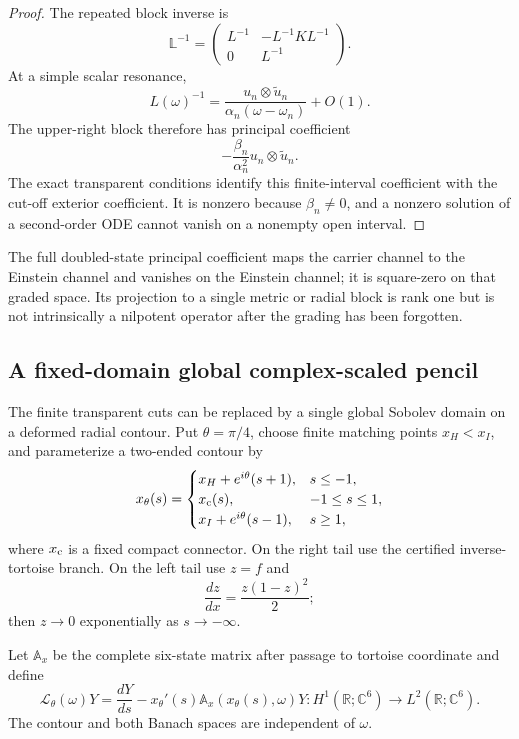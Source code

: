 \documentclass[11pt]{article}
\theoremstyle{remark}
\begin{document}
\begin{proof}
The repeated block inverse is
\[
 \mathbb L^{-1}=
 \begin{pmatrix}
 L^{-1}&-L^{-1}KL^{-1}\\
 0&L^{-1}
 \end{pmatrix}.
\]
At a simple scalar resonance,
\[
 L(\omega)^{-1}
 =\frac{u_n\otimes\widetilde u_n}
 {\alpha_n(\omega-\omega_n)}+O(1).
\]
The upper-right block therefore has principal coefficient
\[
 -\frac{\beta_n}{\alpha_n^2}
 u_n\otimes\widetilde u_n.
\]
The exact transparent conditions identify this finite-interval
coefficient with the cut-off exterior coefficient.  It is nonzero because
\(\beta_n\ne0\), and a nonzero solution of a second-order ODE cannot
vanish on a nonempty open interval.
\end{proof}

The full doubled-state principal coefficient maps the carrier channel to
the Einstein channel and vanishes on the Einstein channel; it is
square-zero on that graded space.  Its projection to a single metric or
radial block is rank one but is not intrinsically a nilpotent operator
after the grading has been forgotten.

\subsection{A fixed-domain global complex-scaled pencil}

The finite transparent cuts can be replaced by a single global Sobolev
domain on a deformed radial contour.  Put \(\theta=\pi/4\), choose finite
matching points \(x_H<x_I\), and parameterize a two-ended contour by
\[
 x_\theta(s)=
 \begin{cases}
 x_H+e^{i\theta}(s+1),&s\le-1,\\
 x_{\rm c}(s),&-1\le s\le1,\\
 x_I+e^{i\theta}(s-1),&s\ge1,
 \end{cases}
\]
where \(x_{\rm c}\) is a fixed compact connector.  On the right tail use
the certified inverse-tortoise branch.  On the left tail use
\(z=f\) and
\[
 \frac{dz}{dx}=\frac{z(1-z)^2}{2};
\]
then \(z\to0\) exponentially as \(s\to-\infty\).

Let \(\mathbb A_x\) be the complete six-state matrix after passage to
tortoise coordinate and define
\[
 \mathscr L_\theta(\omega)Y
 =
 \frac{dY}{ds}
 -x_\theta'(s)\mathbb A_x(x_\theta(s),\omega)Y
 :
 H^1(\mathbb R;\mathbb C^6)
 \longrightarrow L^2(\mathbb R;\mathbb C^6).
\]
The contour and both Banach spaces are independent of \(\omega\).
\end{document}
